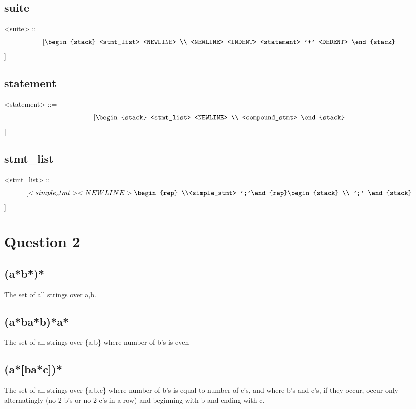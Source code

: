 \documentclass[12pt]{article}
\begin{document}
\subsection{suite}
\begin{grammar}
<suite> ::= \[[ 
    \begin{stack}
    <stmt_list> <NEWLINE> \\
    <NEWLINE> <INDENT> <statement> '+' <DEDENT>
    \end{stack}
\]]
\end{grammar}


\subsection{statement}
\begin{grammar}
<statement> ::= \[[ 
    \begin{stack}
    <stmt_list> <NEWLINE> \\
    <compound_stmt>
    \end{stack}
\]]
\end{grammar}


\subsection{stmt_list}
\begin{grammar}
<stmt_list> ::= \[[ 
    <simple_stmt> <NEWLINE> 
     \begin{rep} \\<simple_stmt> ';'\end{rep}
     \begin{stack} \\ ';' \end{stack}
\]]
\end{grammar}


\section{Question 2}
\subsection{(a*b*)*}
The set of all strings over {a,b}.

\subsection{(a*ba*b)*a*}
The set of all strings over \{a,b\} where number of b's is even

\subsection{(a*[ba*c])*}
The set of all strings over \{a,b,c\} where number of b's is equal to number of c's, and where b's and c's, if they occur, occur only alternatingly (no 2 b's or no 2 c's in a row) and beginning with b and ending with c.
\end{document}
